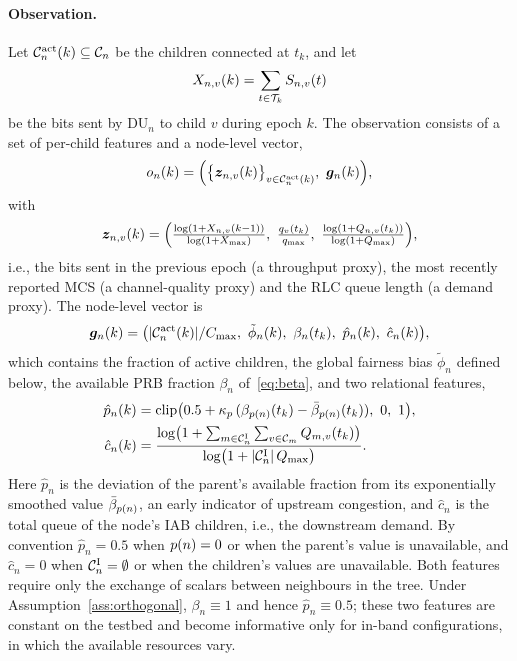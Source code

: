 \begin{EnChapter}
\paragraph{Observation.}
Let $\mathcal{C}_n^{\mathrm{act}}(k) \subseteq \mathcal{C}_n$ be the children connected at $t_k$, and let
\begin{equation}
  X_{n,v}(k) = \sum_{t \in \mathcal{T}_k} S_{n,v}(t)
\end{equation}
be the bits sent by DU$_n$ to child $v$ during epoch $k$. The observation consists of
a set of per-child features and a node-level vector,
\begin{equation}
  o_n(k) = \Bigl( \bigl\{ \bm z_{n,v}(k) \bigr\}_{v \in \mathcal{C}_n^{\mathrm{act}}(k)},\ \bm g_n(k) \Bigr),
\end{equation}
with
\begin{equation}
  \bm z_{n,v}(k) = \Bigl( \tfrac{\log(1 + X_{n,v}(k-1))}{\log(1 + X_{\max})},\ \tfrac{q_v(t_k)}{q_{\max}},\ \tfrac{\log(1 + Q_{n,v}(t_k))}{\log(1 + Q_{\max})} \Bigr),
\end{equation}
i.e., the bits sent in the previous epoch (a throughput proxy), the most recently
reported MCS (a channel-quality proxy) and the RLC queue length (a demand proxy).
The node-level vector is
\begin{equation}
  \bm g_n(k) = \bigl( |\mathcal{C}_n^{\mathrm{act}}(k)| / C_{\max},\ \tilde\phi_n(k),\ \beta_n(t_k),\ \hat p_n(k),\ \hat c_n(k) \bigr),
\end{equation}
which contains the fraction of active children, the global fairness bias
$\tilde\phi_n$ defined below, the available PRB fraction $\beta_n$ of~\eqref{eq:beta}, and two relational
features,
\begin{align}
  \hat p_n(k) &= \clip\bigl( 0.5 + \kappa_p\,(\beta_{\parent(n)}(t_k) - \bar\beta_{\parent(n)}(t_k)),\ 0,\ 1 \bigr), \label{eq:phat}\\
  \hat c_n(k) &= \frac{\log\bigl(1 + \sum_{m \in \Cset_n^{\mathrm{I}}} \sum_{v \in \Cset_m} Q_{m,v}(t_k)\bigr)}{\log\bigl(1 + |\Cset_n^{\mathrm{I}}|\, Q_{\max}\bigr)}. \label{eq:chat}
\end{align}
Here $\hat p_n$ is the deviation of the parent's available fraction from its
exponentially smoothed value $\bar\beta_{p(n)}$, an early indicator of upstream
congestion, and $\hat c_n$ is the total queue of the node's IAB children, i.e., the
downstream demand. By convention $\hat p_n = 0.5$ when $p(n) = 0$ or when the
parent's value is unavailable, and $\hat c_n = 0$ when $\mathcal{C}_n^{\mathrm{I}} = \emptyset$
or when the children's values are unavailable. Both features require only the
exchange of scalars between neighbours in the tree. Under
Assumption~\ref{ass:orthogonal}, $\beta_n \equiv 1$ and hence $\hat p_n \equiv 0.5$;
these two features are constant on the testbed and become informative only for
in-band configurations, in which the available resources vary.


\end{EnChapter}
